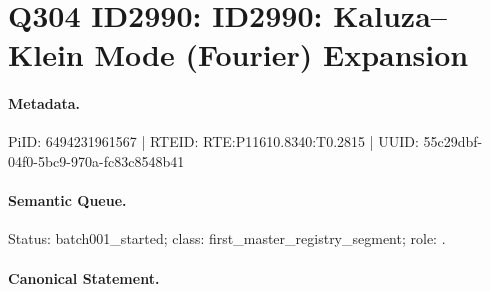 \section*{Q304 ID2990: ID2990: Kaluza–Klein Mode (Fourier) Expansion}
\paragraph{Metadata.}
PiID: 6494231961567 | RTEID: RTE:P11610.8340:T0.2815 | UUID: 55c29dbf-04f0-5bc9-970a-fc83c8548b41

\paragraph{Semantic Queue.}
Status: batch001\_started; class: first\_master\_registry\_segment; role: .

\paragraph{Canonical Statement.}
